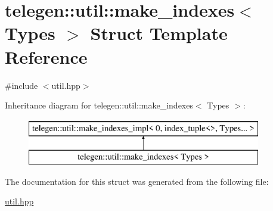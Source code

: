 \hypertarget{structtelegen_1_1util_1_1make__indexes}{}\section{telegen\+:\+:util\+:\+:make\+\_\+indexes$<$ Types $>$ Struct Template Reference}
\label{structtelegen_1_1util_1_1make__indexes}


{\ttfamily \#include $<$util.\+hpp$>$}

Inheritance diagram for telegen\+:\+:util\+:\+:make\+\_\+indexes$<$ Types $>$\+:\begin{figure}[H]
\begin{center}
\leavevmode
\includegraphics[height=2.000000cm]{structtelegen_1_1util_1_1make__indexes}
\end{center}
\end{figure}


The documentation for this struct was generated from the following file\+:\begin{DoxyCompactItemize}
\item 
\hyperlink{util_8hpp}{util.\+hpp}\end{DoxyCompactItemize}
